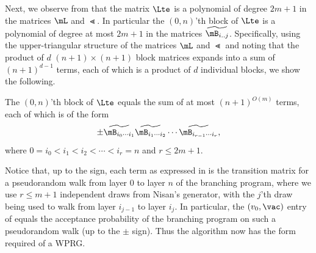 \documentclass{toc}
\begin{document}
    Next, we observe from  that the matrix $\Lte$ is a polynomial of degree $2m+1$ in the matrices $\mL$ and $\Lt$.  In particular the $(0,n)$'th block of $\Lte$ is a polynomial of degree at most $2m+1$ in the matrices $\widetilde{\mB_{i .. j}}$.  Specifically, using the upper-triangular structure of the matrices $\mL$ and $\Lt$ and noting that the product of $d$ $(n+1)\times (n+1)$ block matrices expands into a sum of $(n+1)^{d-1}$ terms, each of which is a product of $d$ individual blocks, we show the following. %
    
    \begin{observation} \label{obs:path}
    The $(0,n)$'th block of $\Lte$ equals the sum of at most $(n+1)^{O(m)}$ terms, each of which is of the form 
    \begin{equation} \label{eqn:terms}
    \pm \widetilde{\mB_{i_0\cdots i_1}}
    \widetilde{\mB_{i_1\cdots i_2}}
    \cdots
    \widetilde{\mB_{i_{r-1}\cdots i_r}},
    \end{equation}
    where $0=i_0<i_1<i_2<\cdots<i_r=n$ and $r\leq 2m+1$.
    \end{observation}
    
    Notice that, up to the sign, each term as expressed in  is the transition matrix for a pseudorandom walk from layer 0 to layer $n$ of the branching program, where we use $r\leq m+1$ independent draws from Nisan's generator, with the $j$'th draw being used to walk from layer $i_{j-1}$ to layer $i_j$.  In particular,
    the $(v_0,\vac)$ entry of  equals the acceptance probability of the branching program on such a pseudorandom walk (up to the $\pm$ sign).
    Thus the algorithm now has the form required of a WPRG. 
    
\end{document}
